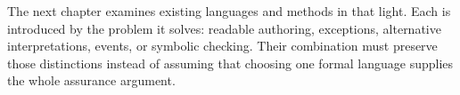 The next chapter examines existing languages and methods in that light. Each
is introduced by the problem it solves: readable authoring, exceptions,
alternative interpretations, events, or symbolic checking. Their combination
must preserve those distinctions instead of assuming that choosing one formal
language supplies the whole assurance argument.
